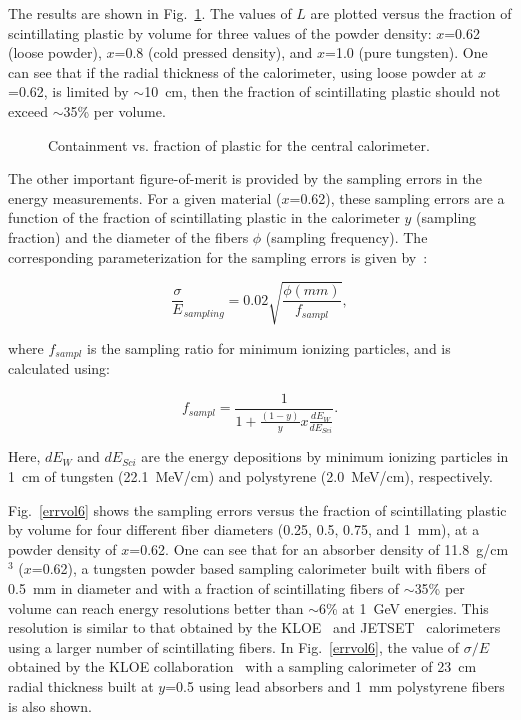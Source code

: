 The results are shown in Fig.~\ref{errlon}.  The values of $L$ are 
plotted versus the fraction of scintillating plastic by volume for three 
values of the powder density: $x$=0.62 (loose powder), $x$=0.8 (cold 
pressed density), and $x$=1.0 (pure tungsten).  One can see that if the 
radial thickness of the calorimeter, using loose powder at $x$=0.62, is 
limited by $\sim$10~cm, then the fraction of scintillating plastic should 
not exceed $\sim$35\% per volume.

\begin{figure}
\vspace{9.0cm} 
\caption{\small{Containment vs. fraction of plastic for the central
calorimeter.}}
\label{errlon}
\end{figure}

The other important figure-of-merit is provided by the sampling errors in 
the energy measurements.  For a given material ($x$=0.62), these sampling 
errors are a function of the fraction of scintillating plastic in the 
calorimeter $y$ (sampling fraction) and the diameter of the fibers $\phi$ 
(sampling frequency).  The corresponding parameterization for the sampling 
errors is given by~\cite{Wig20}: 

\begin{equation}
{\frac{\sigma}{E}}_{sampling} = 0.02 \sqrt{\frac{\phi(mm)}{f_{sampl}}},
\end{equation}

\noindent
where $f_{sampl}$ is the sampling ratio for minimum ionizing particles,
and is calculated using:

\begin{equation}
f_{sampl} = \frac{1}{1+\frac{(1-y)}{y} x \frac{dE_{W}}{dE_{Sci}}}.
\end{equation}

\noindent
Here, $dE_{W}$ and $dE_{Sci}$ are the energy depositions by minimum 
ionizing particles in 1~cm of tungsten (22.1~MeV/cm) and polystyrene 
(2.0~MeV/cm), respectively.
 
Fig.~\ref{errvol6} shows the sampling errors versus the fraction of 
scintillating plastic by volume for four different fiber diameters (0.25, 
0.5, 0.75, and 1~mm), at a powder density of $x$=0.62.  One can see that 
for an absorber density of 11.8~g/cm$^3$ ($x$=0.62), a tungsten powder 
based sampling calorimeter built with fibers of 0.5~mm in diameter and 
with a fraction of scintillating fibers of $\sim$35\% per volume can reach 
energy resolutions better than $\sim$6\% at 1~GeV energies.  This 
resolution is similar to that obtained by the KLOE~\cite{Ant96} and 
JETSET~\cite{Hert90} calorimeters using a larger number of scintillating 
fibers.  In Fig.~\ref{errvol6}, the value of $\sigma/E$ obtained by the KLOE 
collaboration~\cite{Ant96} with a sampling calorimeter of 23~cm radial 
thickness built at $y$=0.5 using lead absorbers and 1~mm polystyrene fibers
is also shown.

